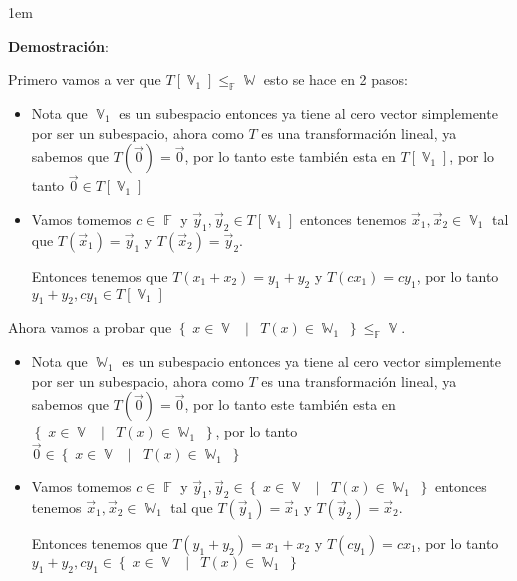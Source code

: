 \documentclass[12pt, fleqn]{article}                             %
\newenvironment{SmallIndentation}[1][0.75em]                    %
        {\begin{adjustwidth}{#1}{}\begin{footnotesize}}             %
        {\end{footnotesize}\end{adjustwidth}}                       %
\DeclareMathOperator \Space {\quad}                             %
\DeclareMathOperator \MiniSpace {\;}                            %
\newcommand \Such {\MiniSpace | \MiniSpace}                     %
\theoremstyle{break}                                            %
\DeclareMathOperator \GenericField {\mathbb{F}}                 %
\DeclareMathOperator \VectorSet    {\mathbb{V}}                 %
\DeclareMathOperator \SubVectorSet {\mathbb{W}}                 %
\newcommand{\Set}[1]    {\left\{ \; #1 \; \right\}}             %
\begin{document}
    \begin{SmallIndentation}[1em]
        \textbf{Demostración}:
        
        Primero vamos a ver que $T[\VectorSet_1] \leq_{\GenericField} \SubVectorSet$
        esto se hace en 2 pasos:
        \begin{itemize}
            \item 
                Nota que $\VectorSet_1$ es un subespacio entonces ya tiene al cero
                vector simplemente por ser un subespacio, ahora como $T$ es una transformación
                lineal, ya sabemos que $T(\vec 0) = \vec 0$, por lo tanto este también 
                esta en $T[\VectorSet_1]$, por lo tanto $\vec 0 \in T[\VectorSet_1]$

            \item
                Vamos tomemos $c \in \GenericField$ y $\vec y_1, \vec y_2 \in T[\VectorSet_1]$
                entonces tenemos $\vec x_1, \vec x_2 \in \VectorSet_1$ tal que 
                $T(\vec x_1) = \vec y_1$ y $T(\vec x_2) = \vec y_2$.

                Entonces tenemos que $T(x_1 + x_2) = y_1 + y_2$ y $T(cx_1) = cy_1$, por lo tanto
                $y_1 + y_2, cy_1 \in T[\VectorSet_1]$
        \end{itemize}

        Ahora vamos a probar que $\Set{x \in \VectorSet \Such T(x) \in \SubVectorSet_1} 
        \leq_{\GenericField} \VectorSet$.
        \begin{itemize}
            \item 
                Nota que $\SubVectorSet_1$ es un subespacio entonces ya tiene al cero
                vector simplemente por ser un subespacio, ahora como $T$ es una transformación
                lineal, ya sabemos que $T(\vec 0) = \vec 0$, por lo tanto este también 
                esta en $\Set{x \in \VectorSet \Such T(x) \in \SubVectorSet_1}$, por lo
                tanto $\vec 0 \in \Set{x \in \VectorSet \Such T(x) \in \SubVectorSet_1}$

            \item
                Vamos tomemos $c \in \GenericField$ y 
                $\vec y_1, \vec y_2 \in \Set{x \in \VectorSet \Such T(x) \in \SubVectorSet_1}$
                entonces tenemos $\vec x_1, \vec x_2 \in \SubVectorSet_1$ tal que 
                $T(\vec y_1) = \vec x_1$ y $T(\vec y_2) = \vec x_2$.

                Entonces tenemos que $T(y_1 + y_2) = x_1 + x_2$ y $T(cy_1) = cx_1$, por lo tanto
                $y_1 + y_2, cy_1 \in \Set{x \in \VectorSet \Such T(x) \in \SubVectorSet_1}$
        \end{itemize}

    \end{SmallIndentation}
                            
\end{document}
